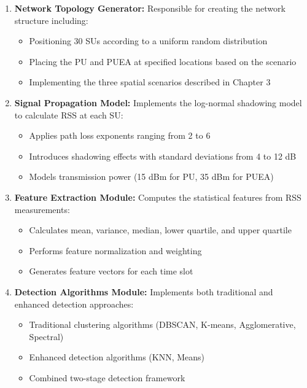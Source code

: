 \begin{enumerate}
    \item \textbf{Network Topology Generator:} Responsible for creating the network structure including:
    \begin{itemize}
        \item Positioning 30 SUs according to a uniform random distribution
        \item Placing the PU and PUEA at specified locations based on the scenario
        \item Implementing the three spatial scenarios described in Chapter 3
    \end{itemize}
    
    \item \textbf{Signal Propagation Model:} Implements the log-normal shadowing model to calculate RSS at each SU:
    \begin{itemize}
        \item Applies path loss exponents ranging from 2 to 6
        \item Introduces shadowing effects with standard deviations from 4 to 12 dB
        \item Models transmission power (15 dBm for PU, 35 dBm for PUEA)
    \end{itemize}
    
    \item \textbf{Feature Extraction Module:} Computes the statistical features from RSS measurements:
    \begin{itemize}
        \item Calculates mean, variance, median, lower quartile, and upper quartile
        \item Performs feature normalization and weighting
        \item Generates feature vectors for each time slot
    \end{itemize}
    
    \item \textbf{Detection Algorithms Module:} Implements both traditional and enhanced detection approaches:
    \begin{itemize}
        \item Traditional clustering algorithms (DBSCAN, K-means, Agglomerative, Spectral)
        \item Enhanced detection algorithms (KNN, Means)
        \item Combined two-stage detection framework
    \end{itemize}
\end{enumerate}

